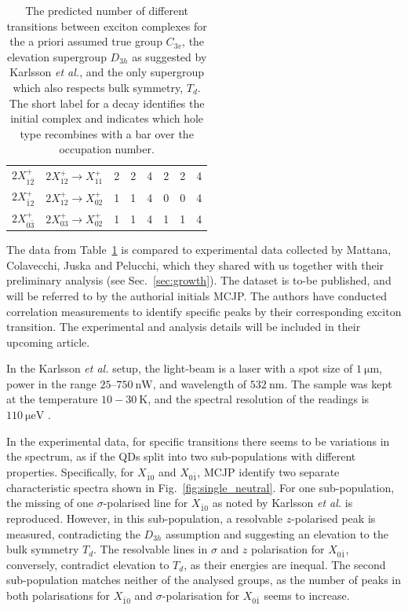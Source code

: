 \begin{table}
\begin{center}
\begin{tabular}{c c | c c c | c c c}
 $2X^+_{1\bar{2}}$ & $2X^+_{12}\to X^+_{11}$ & 2 & 2 & 4 & 2 & 2 & 4\\
 $2X^+_{\bar{1}2}$ & $2X^+_{12}\to X^+_{02}$ & 1 & 1 & 4 & 0 & 0 & 4\\
 $2X^+_{0\bar{3}}$ & $2X^+_{03}\to X^+_{02}$ & 1 & 1 & 4 & 1 & 1 & 4
\end{tabular}
\end{center}
\caption{The predicted number of different transitions between exciton complexes for the a priori assumed true group $C_{3v}$, the elevation supergroup $D_{3h}$ as suggested by Karlsson \textit{et al.}, and the only supergroup which also respects bulk symmetry, $T_d$. The short label for a decay identifies the initial complex and indicates which hole type recombines with a bar over the occupation number. \label{tab:predictions}}
\end{table}

The data from Table~\ref{tab:predictions} is compared to experimental data collected by Mattana, Colavecchi, Juska and Pelucchi, which they shared with us together with their preliminary analysis (see Sec.~\ref{sec:growth}). The dataset is to-be published, and will be referred to by the authorial initials MCJP. The authors have conducted correlation measurements to identify specific peaks by their corresponding exciton transition. The experimental and analysis details will be included in their upcoming article.

In the Karlsson \textit{et al.} setup, the light-beam is a laser with a spot size of $\SI{1}{\micro\metre}$, power in the range $25$--$\SI{750}{\nano\watt}$, and wavelength of $\SI{532}{\nano\metre}$. The sample was kept at the temperature $10-\SI{30}{\kelvin}$, and the spectral resolution of the readings is $\SI{110}{\micro\electronvolt}$ \cite[p.~2]{karlsson}.

In the experimental data, for specific transitions there seems to be variations in the spectrum, as if the QDs split into two sub-populations with different properties. Specifically, for $X_{\bar{1}0}$ and $X_{0\bar{1}}$, MCJP identify two separate characteristic spectra shown in Fig.~\ref{fig:single_neutral}. For one sub-population, the missing of one $\sigma$-polarised line for $X_{\bar{1}0}$ as noted by Karlsson \textit{et al.} is reproduced. However, in this sub-population, a resolvable $z$-polarised peak is measured, contradicting the $D_{3h}$ assumption and suggesting an elevation to the bulk symmetry $T_d$. The resolvable lines in $\sigma$ and $z$ polarisation for $X_{0\bar{1}}$, conversely, contradict elevation to $T_d$, as their energies are inequal. The second sub-population matches neither of the analysed groups, as the number of peaks in both polarisations for $X_{\bar{1}0}$ and $\sigma$-polarisation for $X_{0\bar{1}}$ seems to increase.

